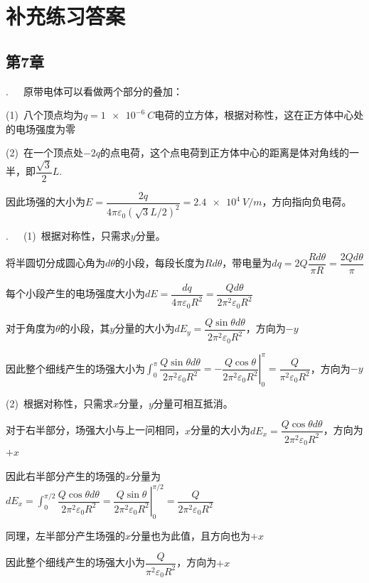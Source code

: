 \chapter*{补充练习答案}

\section*{第7章}

.~~~原带电体可以看做两个部分的叠加：

(1)~八个顶点均为$q=\SI{1e-6}{C}$电荷的立方体，根据对称性，这在正方体中心处的电场强度为零

(2)~在一个顶点处$-2q$的点电荷，这个点电荷到正方体中心的距离是体对角线的一半，即$\dfrac{\sqrt{3}}{2}L$.

因此场强的大小为$E=\dfrac{2q}{4\pi\varepsilon_0 (\sqrt{3}L/2)^2}=\SI{2.4e4}{V/m}$，方向指向负电荷。

\noindent\hdashrule{\textwidth}{1pt}{1pt}

.~~~(1)~根据对称性，只需求$y$分量。

将半圆切分成圆心角为$d\theta$的小段，每段长度为$Rd\theta$，带电量为$dq=2Q\dfrac{Rd\theta}{\pi R}=\dfrac{2Qd\theta}{\pi}$

每个小段产生的电场强度大小为$dE=\dfrac{dq}{4\pi\varepsilon_0 R^2}=\dfrac{Qd\theta}{2\pi^2\varepsilon_0 R^2}$

对于角度为$\theta$的小段，其$y$分量的大小为$dE_y=\dfrac{Q\sin{\theta}d\theta}{2\pi^2\varepsilon_0 R^2}$，方向为$-y$

因此整个细线产生的场强大小为$\displaystyle \int_0^\pi {\dfrac{Q\sin{\theta}d\theta}{2\pi^2\varepsilon_0 R^2}}=-\left.\dfrac{Q\cos{\theta}}{2\pi^2\varepsilon_0 R^2}\right|_0^\pi=\dfrac{Q}{\pi^2\varepsilon_0 R^2}$，方向为$-y$

(2)~根据对称性，只需求$x$分量，$y$分量可相互抵消。

对于右半部分，场强大小与上一问相同，$x$分量的大小为$dE_x=\dfrac{Q\cos{\theta}d\theta}{2\pi^2\varepsilon_0 R^2}$，方向为$+x$

因此右半部分产生的场强的$x$分量为$dE_x=\displaystyle \int_0^{\pi/2}\dfrac{Q\cos{\theta}d\theta}{2\pi^2\varepsilon_0 R^2}=\left.\dfrac{Q\sin{\theta}}{2\pi^2\varepsilon_0 R^2}\right|_0^{\pi/2}=\dfrac{Q}{2\pi^2\varepsilon_0 R^2}$

同理，左半部分产生场强的$x$分量也为此值，且方向也为$+x$

因此整个细线产生的场强大小为$\dfrac{Q}{\pi^2\varepsilon_0 R^2}$，方向为$+x$

\noindent\hdashrule{\textwidth}{1pt}{1pt}

